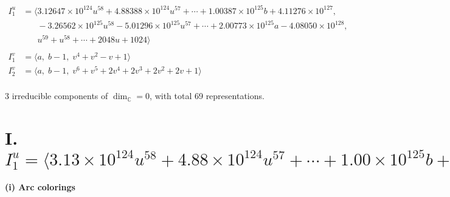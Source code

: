 \documentclass[1p]{elsarticle_modified}
\theoremstyle{definition}
\begin{document}
\begin{align*}
I^u_{1}&=\langle 
3.12647\times10^{124} u^{58}+4.88388\times10^{124} u^{57}+\cdots+1.00387\times10^{125} b+4.11276\times10^{127},\\
\phantom{I^u_{1}}&\phantom{= \langle  }-3.26562\times10^{125} u^{58}-5.01296\times10^{125} u^{57}+\cdots+2.00773\times10^{125} a-4.08050\times10^{128},\\
\phantom{I^u_{1}}&\phantom{= \langle  }u^{59}+u^{58}+\cdots+2048 u+1024\rangle \\
\\
I^v_{1}&=\langle 
a,\;b-1,\;v^4+v^2- v+1\rangle \\
I^v_{2}&=\langle 
a,\;b-1,\;v^6+v^5+2 v^4+2 v^3+2 v^2+2 v+1\rangle \\
\end{align*}
\raggedright * 3 irreducible components of $\dim_{\mathbb{C}}=0$, with total 69 representations.\\
\newpage
\renewcommand{\arraystretch}{1}
\centering \section*{I. $I^u_{1}= \langle 3.13\times10^{124} u^{58}+4.88\times10^{124} u^{57}+\cdots+1.00\times10^{125} b+4.11\times10^{127},\;-3.27\times10^{125} u^{58}-5.01\times10^{125} u^{57}+\cdots+2.01\times10^{125} a-4.08\times10^{128},\;u^{59}+u^{58}+\cdots+2048 u+1024 \rangle$}
\flushleft \textbf{(i) Arc colorings}\\
\end{document}
